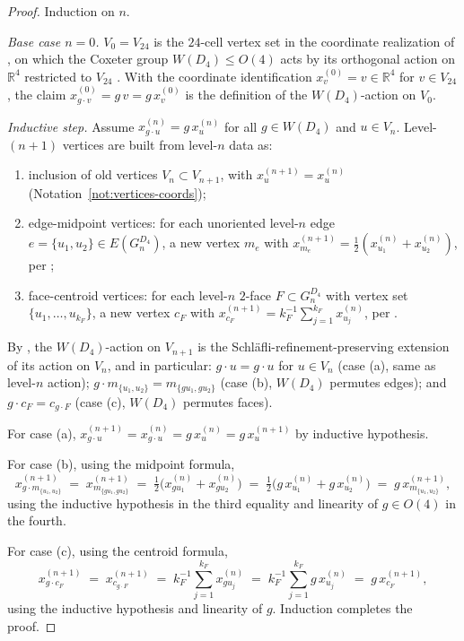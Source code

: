 \documentclass[11pt, a4paper]{amsart}
\theoremstyle{definition}
\newcommand{\R}{\mathbb{R}}
\begin{document}
\begin{proof}
Induction on $n$.

\emph{Base case $n = 0$.} $V_0 = V_{24}$ is the $24$-cell vertex
set in the coordinate realization of
\cite[Def.~5.3]{AlgebraicSubstrate}, on which the Coxeter group
$W(D_4) \leq O(4)$ acts by its orthogonal action on $\R^4$
restricted to $V_{24}$ \cite[\S 3, Cor.~5.5]{AlgebraicSubstrate}.
With the coordinate identification $x_v^{(0)} = v \in \R^4$ for
$v \in V_{24}$, the claim $x_{g \cdot v}^{(0)} = g\,v = g\,x_v^{(0)}$
is the definition of the $W(D_4)$-action on $V_0$.

\emph{Inductive step.} Assume $x_{g \cdot u}^{(n)} = g\,x_u^{(n)}$
for all $g \in W(D_4)$ and $u \in V_n$. Level-$(n+1)$ vertices
are built from level-$n$ data as:
\begin{enumerate}
\item[\textup{(a)}] inclusion of old vertices
  $V_n \subset V_{n+1}$, with $x_u^{(n+1)} = x_u^{(n)}$
  (Notation~\ref{not:vertices-coords});
\item[\textup{(b)}] edge-midpoint vertices: for each unoriented
  level-$n$ edge $e = \{u_1, u_2\} \in E(G_n^{D_4})$, a new vertex
  $m_e$ with $x_{m_e}^{(n+1)} = \tfrac{1}{2}(x_{u_1}^{(n)} +
  x_{u_2}^{(n)})$, per \cite[Def.~2.2]{RefinementSpaces};
\item[\textup{(c)}] face-centroid vertices: for each level-$n$
  $2$-face $F \subset G_n^{D_4}$ with vertex set
  $\{u_1, \ldots, u_{k_F}\}$, a new vertex $c_F$ with
  $x_{c_F}^{(n+1)} = k_F^{-1}\sum_{j=1}^{k_F} x_{u_j}^{(n)}$,
  per \cite[Def.~2.2]{RefinementSpaces}.
\end{enumerate}
By \cite[Prop.~2.6]{RefinementSpaces}, the $W(D_4)$-action on
$V_{n+1}$ is the Schl\"{a}fli-refinement-preserving extension of
its action on $V_n$, and in particular:
$g \cdot u = g \cdot u$ for $u \in V_n$ (case (a), same as
level-$n$ action); $g \cdot m_{\{u_1, u_2\}} = m_{\{g u_1,
g u_2\}}$ (case (b), $W(D_4)$ permutes edges); and
$g \cdot c_F = c_{g \cdot F}$ (case (c), $W(D_4)$ permutes faces).

For case (a), $x_{g \cdot u}^{(n+1)} = x_{g \cdot u}^{(n)} =
g\,x_u^{(n)} = g\,x_u^{(n+1)}$ by inductive hypothesis.

For case (b), using the midpoint formula,
\[
  x_{g \cdot m_{\{u_1, u_2\}}}^{(n+1)}
    \;=\; x_{m_{\{g u_1, g u_2\}}}^{(n+1)}
    \;=\; \tfrac{1}{2}\bigl(x_{g u_1}^{(n)} + x_{g u_2}^{(n)}\bigr)
    \;=\; \tfrac{1}{2}\bigl(g\,x_{u_1}^{(n)} + g\,x_{u_2}^{(n)}\bigr)
    \;=\; g\,x_{m_{\{u_1, u_2\}}}^{(n+1)},
\]
using the inductive hypothesis in the third equality and
linearity of $g \in O(4)$ in the fourth.

For case (c), using the centroid formula,
\[
  x_{g \cdot c_F}^{(n+1)}
    \;=\; x_{c_{g \cdot F}}^{(n+1)}
    \;=\; k_F^{-1}\sum_{j=1}^{k_F} x_{g u_j}^{(n)}
    \;=\; k_F^{-1}\sum_{j=1}^{k_F} g\,x_{u_j}^{(n)}
    \;=\; g\,x_{c_F}^{(n+1)},
\]
using the inductive hypothesis and linearity of $g$. Induction
completes the proof.
\end{proof}
\end{document}
